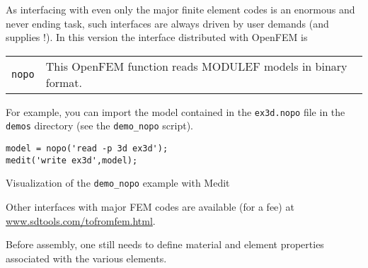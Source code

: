 \newpage
\begin{OPENFEM}

As interfacing with even only the major finite element codes 
is an enormous and never ending task, such interfaces are always driven
by user demands (and supplies !). In this version the interface distributed with OpenFEM is

\lvs\noindent\begin{tabular}{@{}p{}@{}p{}@{}}

{\tt nopo}  & This OpenFEM function reads MODULEF models in binary format.\\

\end{tabular}

For example, you can import the model contained in the {\tt ex3d.nopo} file in the {\tt demos} directory (see the {\tt demo\_nopo} script).
\begin{verbatim}
model = nopo('read -p 3d ex3d');
medit('write ex3d',model);
\end{verbatim}

\begin{center}
\hspace{-0.75cm}
\begin{figure}[H]
\centering
{} %
\end{figure}

Visualization of the {\tt demo\_nopo} example with Medit
\end{center}

Other interfaces with major FEM codes are available (for a fee) at \\\href{http://www.sdtools.com/tofromfem.html}{www.sdtools.com/tofromfem.html}.

\end{OPENFEM}

 

\newpage
Before assembly, one still needs to define material and element properties associated with the various elements. 


